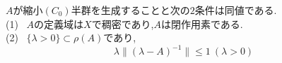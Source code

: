 \thm[吉田-Hilleの定理]
$A$が縮小$(C_0)$半群を生成することと次の$2$条件は同値である.\\
(1) \ $A$の定義域は$X$で稠密であり,$A$は閉作用素である.\\
(2) \ $\{\lambda > 0\} \subset \rho (A)$であり,
\[
\lambda \| (\lambda - A)^{-1} \| \le 1 \ (\lambda > 0)
\]
\thmx


